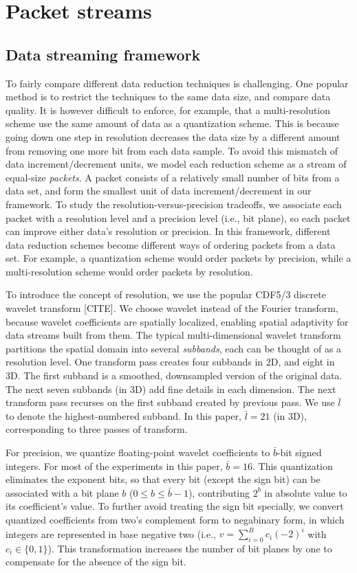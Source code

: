 \section{Packet streams}
\label{sec:terminologies}

\subsection{Data streaming framework}
To fairly compare different data reduction techniques is challenging. One popular method is to
restrict the techniques to the same data size, and compare data quality. It is however difficult to
enforce, for example, that a multi-resolution scheme use the same amount of data as a quantization
scheme. This is because going down one step in resolution decreases the data size by a different
amount from removing one more bit from each data sample. To avoid this mismatch of data
increment/decrement units, we model each reduction scheme as a stream of equal-size \emph{packets}.
A packet consists of a relatively small number of bits from a data set, and form the smallest unit
of data increment/decrement in our framework. To study the resolution-versus-precision tradeoffs, we
associate each packet with a resolution level and a precision level (i.e., bit plane), so each
packet can improve either data's resolution or precision. In this framework, different data
reduction schemes become different ways of ordering packets from a data set. For example, a
quantization scheme would order packets by precision, while a multi-resolution scheme would order
packets by resolution.

To introduce the concept of resolution, we use the popular CDF5/3 discrete wavelet transform [CITE].
We choose wavelet instead of the Fourier transform, because wavelet coefficients are spatially
localized, enabling spatial adaptivity for data streams built from them. The typical
multi-dimensional wavelet transform partitions the spatial domain into several \emph{subbands}, each
can be thought of as a resolution level. One transform pass creates four subbands in 2D, and eight
in 3D. The first subband is a smoothed, downsampled version of the original data. The next seven
subbands (in 3D) add fine details in each dimension. The next transform pass recurses on the first
subband created by previous pass. We use $\bar{l}$ to denote the highest-numbered subband. In this
paper, $\bar{l}=21$ (in 3D), corresponding to three passes of transform.

For precision, we quantize floating-point wavelet coefficients to $\bar{b}$-bit signed integers. For
most of the experiments in this paper, $\bar{b}=16$. This quantization eliminates the exponent bits,
so that every bit (except the sign bit) can be associated with a bit plane $b$ ($0\leq b\leq
\bar{b}-1$), contributing $2^b$ in absolute value to its coefficient's value. To further avoid
treating the sign bit specially, we convert quantized coefficients from two's complement form to
negabinary form, in which integers are represented in base negative two (i.e.,
$v=\sum_{i=0}^{B}{c_i(-2)^i}$ with $c_i\in \{0,1\}$). This transformation increases the number of
bit planes by one to compensate for the absence of the sign bit.

